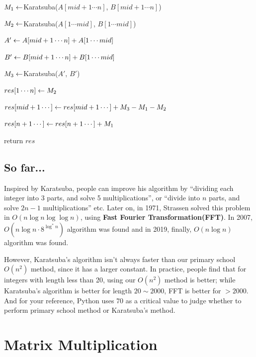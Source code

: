 \begin{spacing}{1.3}
\begin{algorithm}
        $M_1\leftarrow $Karatsuba($A[mid+1\cdots n]$, $B[mid+1\cdots n]$)
        \qquad {}

        $M_2\leftarrow $Karatsuba($A[1\cdots mid]$, $B[1\cdots mid]$)
        \qquad {}

        $A'\leftarrow A[mid+1\cdots n]+A[1\cdots mid]$

        $B'\leftarrow B[mid+1\cdots n]+B[1\cdots mid]$

        $M_3\leftarrow $Karatsuba($A'$, $B'$)
        \qquad {}


        $res[1\cdots n]\leftarrow M_2$

        $res[mid+1\cdots ]\leftarrow res[mid+1\cdots] +M_3-M_1-M_2$

        $res[n+1\cdots]\leftarrow res[n+1\cdots]+M_1$

        return $res$
    \end{algorithm}

    \subsection{So far...}

    Inspired by Karatsuba, people can improve his algorithm by 
    ``dividing each integer into 3 parts, and solve 5 multiplications'',
    or ``divide into $n$ parts, and solve $2n-1$ multiplications'' etc.
    Later on, in 1971, Strassen solved this problem in 
    $O(n\log n\log \log n)$, using {\bf Fast Fourier Transformation(FFT)}.
    In 2007, $O(n\log n\cdot 8^{\log ^* n})$ algorithm was found 
    and in 2019, finally, $O(n\log n)$ algorithm was found.

    However, Karatsuba's algorithm isn't always faster than 
    our primary school $O(n^2)$ method, since it has a larger 
    constant. In practice, people find that for integers with
    length less than 20, using our $O(n^2)$ method is better;
    while Karatsuba's algorithm is better for length $20\sim 2000$,
    FFT is better for $>2000$. And for your reference, Python 
    uses 70 as a critical value to judge whether to perform 
    primary school method or Karatsuba's method.

    \newpage
    \section{Matrix Multiplication}


\end{spacing}
